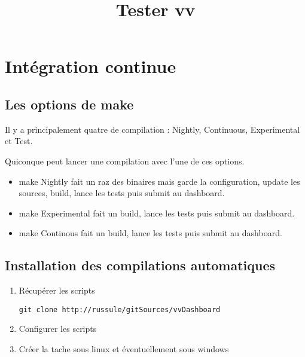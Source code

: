 \documentclass[12pt]{report}
\begin{document}
\title{Tester vv}
\maketitle
\thispagestyle{empty} %
\clearpage

\renewcommand{\contentsname}{Sommaire}
\tableofcontents
\clearpage

 \chapter{Intégration continue}
\section{Les options de make}
Il y a principalement quatre  de compilation : 
Nightly, Continuous, Experimental et Test.

Quiconque peut lancer une compilation avec l'une de ces options.
\begin{itemize}
\item make Nightly fait un raz des binaires mais garde la configuration, update les sources, build, lance les tests puis submit au dashboard.
\item make Experimental fait un build, lance les tests puis submit au dashboard.
\item make Continous fait un build, lance les tests puis submit au dashboard.
\end{itemize}


\section{Installation des compilations automatiques}
\begin{enumerate}
	\item Récupérer les scripts \begin{verbatim}git clone http://russule/gitSources/vvDashboard\end{verbatim}
	\item Configurer les scripts
	\item Créer la tache sous linux et éventuellement sous windows
\end{enumerate}
\end{document}
